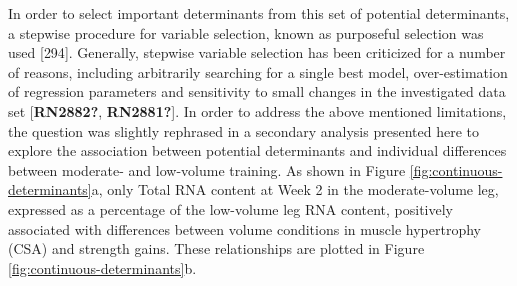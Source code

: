 \documentclass[twoside,10pt]{gihclass} %
\begin{document}
In order to select important determinants from this set of potential determinants, a stepwise procedure for variable selection, known as purposeful selection was used
{[}294{]}.
Generally, stepwise variable selection has been criticized for a number of reasons, including arbitrarily searching for a single best model, over-estimation of regression parameters and sensitivity to small changes in the investigated data set
{[}\textbf{RN2882?}, \textbf{RN2881?}{]}.
In order to address the above mentioned limitations, the question was slightly rephrased in a secondary analysis presented here to explore the association between potential determinants and individual differences between moderate- and low-volume training.
As shown in Figure \ref{fig:continuous-determinants}a, only Total RNA content at Week 2 in the moderate-volume leg, expressed as a percentage of the low-volume leg RNA content, positively associated with differences between volume conditions in muscle hypertrophy (CSA) and strength gains. These relationships are plotted in Figure \ref{fig:continuous-determinants}b.
\end{document}

